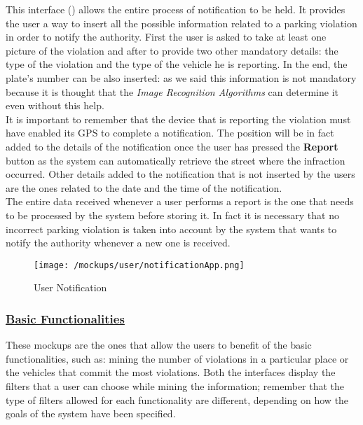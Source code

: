 			This interface () allows the entire process of notification to be held. It provides the user a way to insert all the possible information related to a parking violation in order to notify the authority. First the user is asked to take at least one picture of the violation and after to provide two other mandatory details: the type of the violation and the type of the vehicle he is reporting. In the end, the plate's number can be also inserted: as we said this information is not mandatory because it is thought that the \emph{Image Recognition Algorithms} can determine it even without this help.\\
			
			It is important to remember that the device that is reporting the violation must have enabled its GPS to complete a notification. The position will be in fact added to the details of the notification once the user has pressed the \textbf{Report} button as the system can automatically retrieve the street where the infraction occurred. Other details added to the notification that is not inserted by the users are the ones related to the date and the time of the notification.\\
			
			The entire data received whenever a user performs a report is the one that needs to be processed by the system before storing it. In fact it is necessary that no incorrect parking violation is taken into account by the system that wants to notify the authority whenever a new one is received.
			
			\begin{figure}[ht!]
				\centering
				\texttt{[image: /mockups/user/notificationApp.png]}
				\caption{\label{fig:notificationApp} User Notification}
			\end{figure}
		
		\subsubsection[Basic Functionalities]{\hyperlink{toc}{Basic Functionalities}}
			\label{sec:userBasicFunctionalities}
			
			These mockups are the ones that allow the users to benefit of the basic functionalities, such as: mining the number of violations in a particular place or the vehicles that commit the most violations. Both the interfaces display the filters that a user can choose while mining the information; remember that the type of filters allowed for each functionality are different, depending on how the goals of the system have been specified.
			
